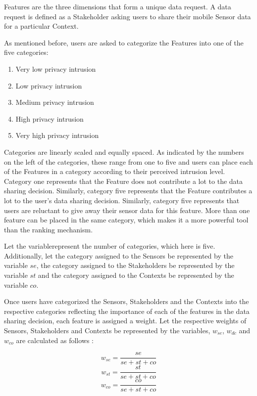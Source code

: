 Features are the three dimensions that form a unique data request. A data request is defined as a Stakeholder asking users to share their mobile Sensor data for a particular Context.

As mentioned before, users are asked to categorize the Features into one of the five categories:

\begin{enumerate}
\item Very low privacy intrusion
\item Low privacy intrusion
\item Medium privacy intrusion
\item High privacy intrusion
\item Very high privacy intrusion
\end{enumerate}

Categories are linearly scaled and equally spaced. As indicated by the numbers on the left of the categories, these range from one to five and users can place each of the Features in a category according to their perceived intrusion level. Category one represents that the Feature does not contribute a lot to the data sharing decision. Similarly, category five represents that the Feature  contributes a lot to the user's data sharing decision. Similarly, category five represents that users are reluctant to give away their sensor data for this feature. More than one feature can be placed in the same category, which makes it a more powerful tool than the ranking mechanism.

Let the variable\numcategories represent the number of categories, which here is five. Additionally, let the category assigned to the Sensors be represented by the variable $se$, the category assigned to the Stakeholders be represented by the variable $st$ and the category assigned to the Contexts be represented by the variable $co$.

Once users have categorized the Sensors, Stakeholders and the Contexts into the respective categories reflecting the importance of each of the features in the data sharing decision, each feature is assigned a weight.
Let the respective weights of Sensors, Stakeholders and Contexts be represented by the variables, $w_{se}$, $w_{dc}$ and $w_{co}$ are calculated as follows :

\begin{equation}
   w_{se} = \frac{se}{se+st+co} 
\end{equation}
\begin{equation}
   w_{st} = \frac{st}{se+st+co}  
\end{equation}
\begin{equation}
   w_{co} = \frac{co}{se+st+co}  
\end{equation}



